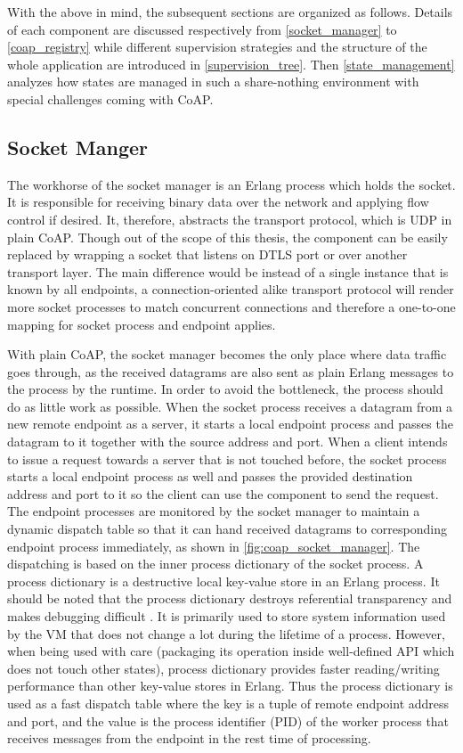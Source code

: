 With the above in mind, the subsequent sections are organized as follows. Details of each component are discussed respectively from \autoref{socket_manager} to \autoref{coap_registry} while different supervision strategies and the structure of the whole application are introduced in \autoref{supervision_tree}. Then \autoref{state_management} analyzes how states are managed in such a share-nothing environment with special challenges coming with CoAP. 

\subsection{Socket Manger}\label{socket_manager}

The workhorse of the socket manager is an Erlang process which holds the socket. It is responsible for receiving binary data over the network and applying flow control if desired. 
It, therefore, abstracts the transport protocol, which is UDP in plain CoAP. Though out of the scope of this thesis, the component can be easily replaced by wrapping a socket that listens on DTLS port or over another transport layer. The main difference would be instead of a single instance that is known by all endpoints, a connection-oriented alike transport protocol will render more socket processes to match concurrent connections and therefore a one-to-one mapping for socket process and endpoint applies. 

With plain CoAP, the socket manager becomes the only place where data traffic goes through, as the received datagrams are also sent as plain Erlang messages to the process by the runtime. In order to avoid the bottleneck, the process should do as little work as possible. When the socket process receives a datagram from a new remote endpoint as a server, it starts a local endpoint process and passes the datagram to it together with the source address and port. When a client intends to issue a request towards a server that is not touched before, the socket process starts a local endpoint process as well and passes the provided destination address and port to it so the client can use the component to send the request. The endpoint processes are monitored by the socket manager to maintain a dynamic dispatch table so that it can hand received datagrams to corresponding endpoint process immediately, as shown in \autoref{fig:coap_socket_manager}. The dispatching is based on the inner process dictionary of the socket process. A process dictionary is a destructive local key-value store in an Erlang process. It should be noted that the process dictionary destroys referential transparency and makes debugging difficult \autocite{erl_proc_dict}. It is primarily used to store system information used by the VM that does not change a lot during the lifetime of a process. However, when being used with care (packaging its operation inside well-defined API which does not touch other states), process dictionary provides faster reading/writing performance than other key-value stores in Erlang. Thus the process dictionary is used as a fast dispatch table where the key is a tuple of remote endpoint address and port, and the value is the process identifier (PID) of the worker process that receives messages from the endpoint in the rest time of processing. 


